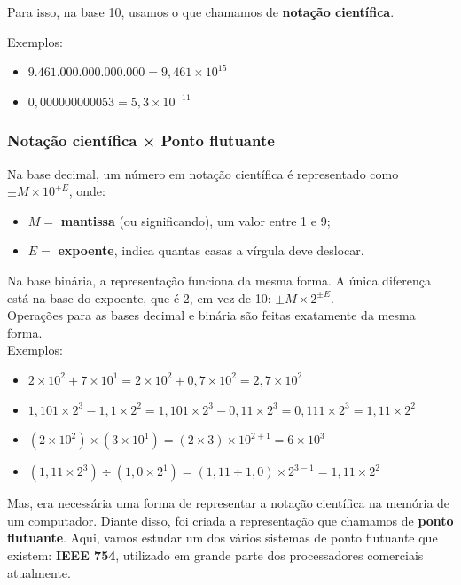 \documentclass[12pt]{article}
\begin{document}
\vspace{0.2cm} 
\noindent
Para isso, na base 10, usamos o que chamamos de \textbf{notação científica}.

\vspace{0.2cm}
\noindent
Exemplos:

\begin{itemize}
    \item $9.461.000.000.000.000 = 9,461 \times 10^{15}$
    \item $0,000000000053 = 5,3 \times 10^{-11}$
\end{itemize}

\subsubsection{Notação científica × Ponto flutuante}
Na base decimal, um número em notação científica é representado como $\pm M \times 10^{\pm E}$, onde:

\begin{itemize}
    \item $M =$ \textbf{mantissa} (ou significando), um valor entre 1 e 9;
    \item $E =$ \textbf{expoente}, indica quantas casas a vírgula deve deslocar.
\end{itemize}

\noindent
Na base binária, a representação funciona da mesma forma. A única diferença está na base do expoente, que é 2, em vez de 10: $\pm M \times 2^{\pm E}$. 
\vspace{0.2cm} \\
Operações para as bases decimal e binária são feitas exatamente da mesma forma. \\ Exemplos:

\begin{itemize}
    \item $2 \times 10^{2} + 7 \times 10^{1} = 2 \times 10^{2} + 0,7 \times 10^{2} = 2,7 \times 10^{2}$
    \item $1,101 \times 2^{3} - 1,1 \times 2^{2} = 1,101 \times 2^{3} - 0,11 \times 2^{3} = 0,111 \times 2^{3} = 1,11 \times 2^{2}$
    \item $(2 \times 10^{2}) \times (3 \times 10^{1}) = (2 \times 3) \times 10^{2+1} = 6 \times 10^{3}$
    \item $(1,11 \times 2^{3}) \div (1,0 \times 2^{1}) = (1,11 \div 1,0) \times 2^{3-1} = 1,11 \times 2^{2}$
\end{itemize}

\vspace{0.2cm} 
\noindent
Mas, era necessária uma forma de representar a notação científica na memória de um computador. Diante disso, foi criada a representação que chamamos de \textbf{ponto flutuante}. Aqui, vamos estudar um dos vários sistemas de ponto flutuante que existem: \textbf{IEEE 754}, utilizado em grande parte dos processadores comerciais atualmente.
\end{document}
